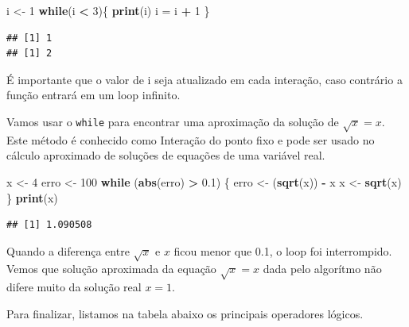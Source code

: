 \documentclass[
]{book}
\newenvironment{Shaded}{\begin{snugshade}}{\end{snugshade}}
\newcommand{\ControlFlowTok}[1]{\textcolor[rgb]{0.13,0.29,0.53}{\textbf{#1}}}
\newcommand{\DecValTok}[1]{\textcolor[rgb]{0.00,0.00,0.81}{#1}}
\newcommand{\FloatTok}[1]{\textcolor[rgb]{0.00,0.00,0.81}{#1}}
\newcommand{\KeywordTok}[1]{\textcolor[rgb]{0.13,0.29,0.53}{\textbf{#1}}}
\newcommand{\NormalTok}[1]{#1}
\newcommand{\OperatorTok}[1]{\textcolor[rgb]{0.81,0.36,0.00}{\textbf{#1}}}
\newcommand{\StringTok}[1]{\textcolor[rgb]{0.31,0.60,0.02}{#1}}
\begin{document}
\begin{Shaded}
\begin{Highlighting}[]
\NormalTok{i <{-}}\StringTok{ }\DecValTok{1}
\ControlFlowTok{while}\NormalTok{(i }\OperatorTok{<}\StringTok{ }\DecValTok{3}\NormalTok{)\{}
  \KeywordTok{print}\NormalTok{(i)}
\NormalTok{  i =}\StringTok{ }\NormalTok{i }\OperatorTok{+}\StringTok{ }\DecValTok{1}
\NormalTok{\}}
\end{Highlighting}
\end{Shaded}

\begin{verbatim}
## [1] 1
## [1] 2
\end{verbatim}

É importante que o valor de i seja atualizado em cada interação, caso contrário a função entrará em um loop infinito.

Vamos usar o \texttt{while} para encontrar uma aproximação da solução de \(\sqrt{x} = x\). Este método é conhecido como Interação do ponto fixo e pode ser usado no cálculo aproximado de soluções de equações de uma variável real.

\begin{Shaded}
\begin{Highlighting}[]
\NormalTok{x <{-}}\StringTok{ }\DecValTok{4}
\NormalTok{erro <{-}}\StringTok{ }\DecValTok{100}
\ControlFlowTok{while}\NormalTok{ (}\KeywordTok{abs}\NormalTok{(erro) }\OperatorTok{>}\StringTok{ }\FloatTok{0.1}\NormalTok{) \{}
\NormalTok{  erro <{-}}\StringTok{ }\NormalTok{(}\KeywordTok{sqrt}\NormalTok{(x)) }\OperatorTok{{-}}\StringTok{ }\NormalTok{x}
\NormalTok{  x <{-}}\StringTok{ }\KeywordTok{sqrt}\NormalTok{(x)}
\NormalTok{\}}
\KeywordTok{print}\NormalTok{(x)}
\end{Highlighting}
\end{Shaded}

\begin{verbatim}
## [1] 1.090508
\end{verbatim}

Quando a diferença entre \(\sqrt{x}\) e \(x\) ficou menor que 0.1, o loop foi interrompido.
Vemos que solução aproximada da equação \(\sqrt{x} = x\) dada pelo algorítmo não difere muito da solução real \(x=1\).

Para finalizar, listamos na tabela abaixo os principais operadores lógicos.
\end{document}
